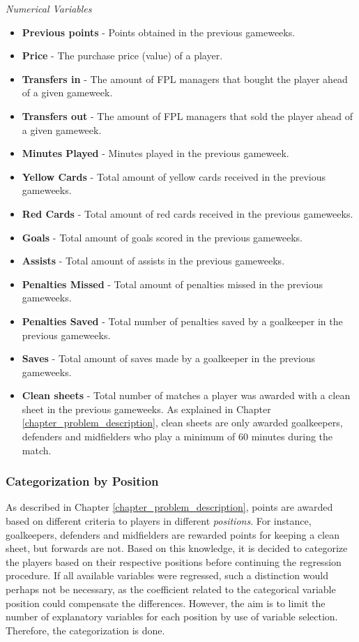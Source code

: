 \textit{Numerical Variables}
\newpar
\begin{itemize}
    \item \textbf{Previous points} - Points obtained in the previous gameweeks.
    \item \textbf{Price} - The purchase price (value) of a player.
    \item \textbf{Transfers in} - The amount of FPL managers that bought the player ahead of a given gameweek.
    \item \textbf{Transfers out} - The amount of FPL managers that sold the player ahead of a given gameweek.
    \item \textbf{Minutes Played} - Minutes played in the previous gameweek.
    \item \textbf{Yellow Cards} - Total amount of yellow cards received in the previous gameweeks.
    \item \textbf{Red Cards} - Total amount of red cards received in the previous gameweeks.
    \item \textbf{Goals} - Total amount of goals scored in the previous gameweeks.
    \item \textbf{Assists} - Total amount of assists in the previous gameweeks.
    \item \textbf{Penalties Missed} - Total amount of penalties missed in the previous gameweeks.
    \item \textbf{Penalties Saved} - Total number of penalties saved by a goalkeeper in the previous gameweeks.
    \item \textbf{Saves} - Total amount of saves made by a goalkeeper in the previous gameweeks.
    \item \textbf{Clean sheets} - Total number of matches a player was awarded with a clean sheet in the previous gameweeks. As explained in Chapter \ref{chapter_problem_description}, clean sheets are only awarded goalkeepers, defenders and midfielders who play a minimum of 60 minutes during the match.
    
\end{itemize}

\subsubsection{Categorization by Position}


As described in Chapter \ref{chapter_problem_description}, points are awarded based on different criteria to players in different \textit{positions}. For instance, goalkeepers, defenders and midfielders are rewarded points for keeping a clean sheet, but forwards are not. Based on this knowledge, it is decided to categorize the players based on their respective positions before continuing the regression procedure. If all available variables were regressed, such a distinction would perhaps not be necessary, as the coefficient related to the categorical variable position could compensate the differences. However, the aim is to limit the number of explanatory variables for each position by use of variable selection. Therefore, the categorization is done. 

